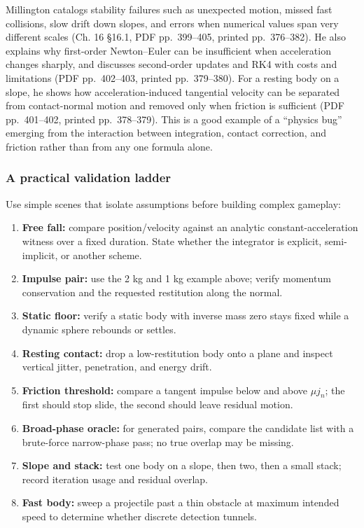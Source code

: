 Millington catalogs stability failures such as unexpected motion, missed fast collisions, slow drift down slopes, and errors when numerical values span very different scales (Ch. 16 §16.1, PDF pp.~399--405, printed pp.~376--382). He also explains why first-order Newton--Euler can be insufficient when acceleration changes sharply, and discusses second-order updates and RK4 with costs and limitations (PDF pp.~402--403, printed pp.~379--380). For a resting body on a slope, he shows how acceleration-induced tangential velocity can be separated from contact-normal motion and removed only when friction is sufficient (PDF pp.~401--402, printed pp.~378--379). This is a good example of a ``physics bug'' emerging from the interaction between integration, contact correction, and friction rather than from any one formula alone.

\subsubsection{A practical validation ladder}\label{a-practical-validation-ladder}

Use simple scenes that isolate assumptions before building complex gameplay:

\begin{enumerate}
\def\labelenumi{\arabic{enumi}.}
\tightlist
\item
  \textbf{Free fall:} compare position/velocity against an analytic constant-acceleration witness over a fixed duration. State whether the integrator is explicit, semi-implicit, or another scheme.
\item
  \textbf{Impulse pair:} use the 2 kg and 1 kg example above; verify momentum conservation and the requested restitution along the normal.
\item
  \textbf{Static floor:} verify a static body with inverse mass zero stays fixed while a dynamic sphere rebounds or settles.
\item
  \textbf{Resting contact:} drop a low-restitution body onto a plane and inspect vertical jitter, penetration, and energy drift.
\item
  \textbf{Friction threshold:} compare a tangent impulse below and above \(\mu j_n\); the first should stop slide, the second should leave residual motion.
\item
  \textbf{Broad-phase oracle:} for generated pairs, compare the candidate list with a brute-force narrow-phase pass; no true overlap may be missing.
\item
  \textbf{Slope and stack:} test one body on a slope, then two, then a small stack; record iteration usage and residual overlap.
\item
  \textbf{Fast body:} sweep a projectile past a thin obstacle at maximum intended speed to determine whether discrete detection tunnels.
\end{enumerate}

